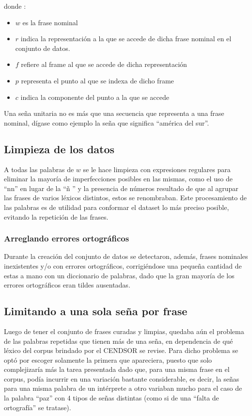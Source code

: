 donde :
\begin{itemize}
 \item $w$ es la frase nominal
 \item $r$ indica la representación a la que se accede de dicha frase nominal en el conjunto de datos.
 \item $f$ refiere al frame al que se accede de dicha representación
 \item $p$ representa el punto al que se indexa de dicho frame
 \item $c$ indica la componente del punto a la que se accede
\end{itemize}
 
  Una seña unitaria no es más que una secuencia que representa a una frase nominal, dígase como ejemplo la seña que significa  ``américa del sur''. 
\subsection{Limpieza de los datos}

 A todas las palabras de $w$ se le hace limpieza con expresiones regulares para eliminar la mayoría de imperfecciones posibles en las mismas, como el uso de ``nn'' en lugar de la ``ñ '' y la presencia de números resultado de que al agrupar las frases de varios léxicos distintos, estos se renombraban. Este procesamiento de las palabras es de utilidad para conformar el dataset lo más preciso posible, evitando la repetición de las frases.
 
\subsubsection{Arreglando errores ortográficos}

Durante la creación del conjunto de datos se detectaron, además, frases nominales inexistentes y/o con errores ortográficos, corrigiéndose una pequeña cantidad de estas a mano con un diccionario de palabras, dado que la gran mayoría de los errores ortográficos eran tildes ausentadas.

\subsection{Limitando a una sola seña por frase}
Luego de tener el conjunto de frases curadas y limpias, quedaba aún el problema de las palabras repetidas que tienen más de una seña, en dependencia de qué léxico del corpus brindado por el CENDSOR se revise.
Para dicho problema se optó por escoger solamente la primera que apareciera, puesto que solo complejizaría más la tarea presentada dado que, para una misma frase en el corpus, podía incurrir en una variación bastante considerable, es decir, la señas para una misma palabra de un intérprete a otro variaban mucho para el caso de la palabra ``paz'' con 4 tipos de señas distintas (como si de una ``falta de ortografía'' se tratase). 

